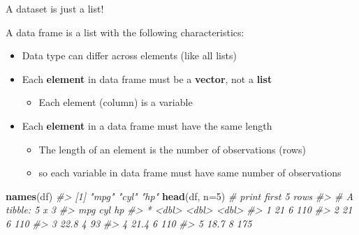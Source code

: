 \documentclass[10pt,ignorenonframetext,]{beamer}
\newenvironment{Shaded}{\begin{snugshade}}{\end{snugshade}}
\newcommand{\KeywordTok}[1]{\textcolor[rgb]{0.13,0.29,0.53}{\textbf{#1}}}
\newcommand{\DataTypeTok}[1]{\textcolor[rgb]{0.13,0.29,0.53}{#1}}
\newcommand{\DecValTok}[1]{\textcolor[rgb]{0.00,0.00,0.81}{#1}}
\newcommand{\CommentTok}[1]{\textcolor[rgb]{0.56,0.35,0.01}{\textit{#1}}}
\newcommand{\NormalTok}[1]{#1}
\providecommand{\tightlist}{%
  \setlength{\itemsep}{0pt}\setlength{\parskip}{0pt}}
\begin{document}
\begin{frame}[fragile]{A dataset is just a list!}

\medskip A data frame is a list with the following characteristics:

\begin{itemize}
\tightlist
\item
  Data type can differ across elements (like all lists)
\item
  Each \textbf{element} in data frame must be a \textbf{vector}, not a
  \textbf{list}

  \begin{itemize}
  \tightlist
  \item
    Each element (column) is a variable
  \end{itemize}
\item
  Each \textbf{element} in a data frame must have the same length

  \begin{itemize}
  \tightlist
  \item
    The length of an element is the number of observations (rows)
  \item
    so each variable in data frame must have same number of observations
  \end{itemize}
\end{itemize}

\begin{Shaded}
\begin{Highlighting}[]
\KeywordTok{names}\NormalTok{(df)}
\CommentTok{#> [1] "mpg" "cyl" "hp"}
\KeywordTok{head}\NormalTok{(df, }\DataTypeTok{n=}\DecValTok{5}\NormalTok{) }\CommentTok{# print first 5 rows}
\CommentTok{#> # A tibble: 5 x 3}
\CommentTok{#>     mpg   cyl    hp}
\CommentTok{#> * <dbl> <dbl> <dbl>}
\CommentTok{#> 1  21       6   110}
\CommentTok{#> 2  21       6   110}
\CommentTok{#> 3  22.8     4    93}
\CommentTok{#> 4  21.4     6   110}
\CommentTok{#> 5  18.7     8   175}
\end{Highlighting}
\end{Shaded}

\end{frame}
\end{document}
